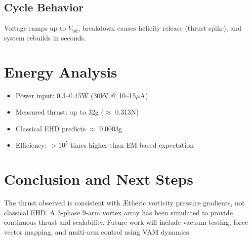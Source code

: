     \subsection{Cycle Behavior}
    Voltage ramps up to $V_{\text{bd}}$, breakdown causes helicity release (thrust spike), and system rebuilds in seconds.

    \section{Energy Analysis}
    \begin{itemize}
        \item Power input: 0.3--0.45W (30kV @ 10--15$\mu$A)
        \item Measured thrust: up to 32g ($\approx$ 0.313N)
        \item Classical EHD predicts $\approx$ 0.0003g
        \item Efficiency: $>10^5$ times higher than EM-based expectation
    \end{itemize}

    \section{Conclusion and Next Steps}
    The thrust observed is consistent with Ætheric vorticity pressure gradients, not classical EHD. A 3-phase 9-arm vortex array has been simulated to provide continuous thrust and scalability. Future work will include vacuum testing, force vector mapping, and multi-arm control using VAM dynamics.
